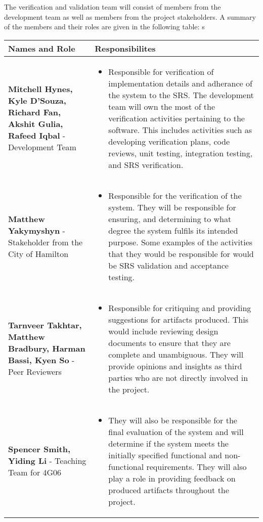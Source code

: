 \documentclass[12pt, titlepage]{article}
\begin{document}
The verification and validation team will consist of members from the
development team as well as members from the project stakeholders. A summary of
the members and their roles are given in the following table:
\setlength{\arrayrulewidth}{0.5mm}
\setlength{\tabcolsep}{18pt}
\renewcommand{\arraystretch}{1.5}s
\begin{tabular}{ | m{5cm} | m{9cm} | }
  \hline
  \textbf{Names and Role} & \textbf{Responsibilites} \\
  \hline
  \textbf{Mitchell Hynes, Kyle D'Souza, Richard Fan, Akshit Gulia, Rafeed
  Iqbal} - Development Team &
  \begin{itemize}
    \item Responsible for verification of implementation details and
      adherance of the system to the SRS. The development team will own the
      most of the verification activities pertaining to the software. This
      includes activities such as developing verification plans, code reviews,
      unit testing, integration testing, and SRS verification.

  \end{itemize}\\
  \hline
  \textbf{Matthew Yakymyshyn} - Stakeholder from the City of Hamilton &
  \begin{itemize}
    \item Responsible for the verification of the system. They will be
      responsible for ensuring, and determining to what degree the
      system fulfils its intended purpose.
      Some examples of the activities that they would be responsible for
      would be SRS validation and acceptance testing.

  \end{itemize}\\
  \hline
  \textbf{Tarnveer Takhtar, Matthew Bradbury, Harman Bassi, Kyen So}
  - Peer Reviewers &
  \begin{itemize}
    \item Responsible for critiquing and providing suggestions for artifacts
      produced. This would include reviewing design documents to ensure that
      they are complete and unambiguous. They will provide opinions and
      insights as third parties who are not directly involved in the project.
  \end{itemize}\\
  \hline
  \textbf{Spencer Smith, Yiding Li} - Teaching Team for 4G06 &
  \begin{itemize}
    \item They will also be responsible for the final
      evaluation of the system and will determine if the system meets the
      initially specified functional and non-functional requirements.
      They will also play a role in providing feedback on produced artifacts
      throughout the project.
  \end{itemize}\\
  \hline

\end{tabular}
\end{document}
